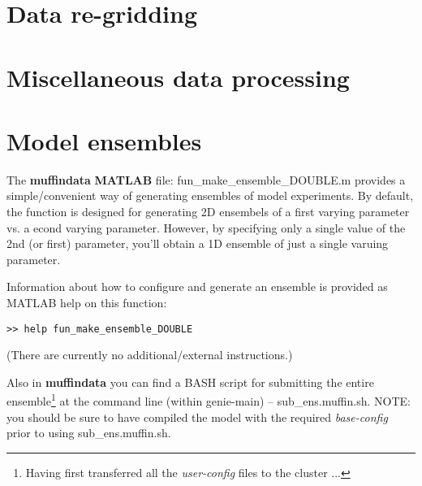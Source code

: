 \documentclass[11pt,fleqn]{book} %
\begin{document}
\hfill \break
\vspace{24mm}


\newpage


\section{Data re-gridding}


\newpage


\section{Miscellaneous data processing}



\newpage


\section{Model ensembles}

The \textbf{muffindata} \textbf{MATLAB} file: \textsf{\footnotesize fun\_make\_ensemble\_DOUBLE.m} provides a simple/convenient way of generating ensembles of model experiments. By default, the function is designed for generating 2D ensembels of a first varying parameter vs. a econd varying parameter. However, by specifying only a single value of the 2nd (or first) parameter, you'll obtain a 1D ensemble of just a single varuing parameter.

Information about how to configure and generate an ensemble is provided as MATLAB help on this function:
\vspace{-2mm}
\begin{verbatim}
>> help fun_make_ensemble_DOUBLE
\end{verbatim}
\vspace{-2mm}
(There are currently no additional/external instructions.)

Also in \textbf{muffindata} you can find a BASH script for submitting the entire ensemble\footnote{Having first transferred all the \textit{user-config} files to the cluster ...} at the command line (within \textsf{\footnotesize genie-main}) -- \textsf{\footnotesize sub\_ens.muffin.sh}. NOTE: you should be sure to have compiled the model with the required \textit{base-config} prior to using \textsf{\footnotesize sub\_ens.muffin.sh}.
\end{document}
